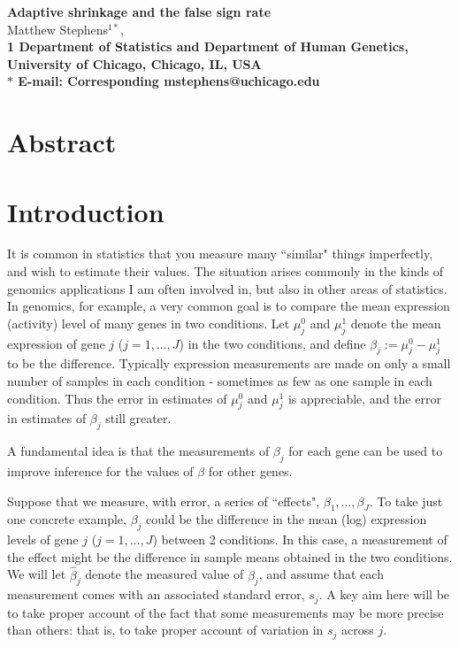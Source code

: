 \documentclass[10pt]{article}
\date{}
\begin{document}
\begin{flushleft}
{\Large
\textbf{Adaptive shrinkage and the false sign rate}
}
\\
Matthew Stephens$^{1*}$, 
\\
\bf{1} Department of Statistics and Department of Human Genetics, University of Chicago, Chicago, IL, USA
\\
$\ast$ E-mail: Corresponding mstephens@uchicago.edu
\end{flushleft}

\section*{Abstract}


\section*{Introduction}

It is common in statistics that you measure many ``similar" things imperfectly, and wish to estimate their values. The situation arises commonly in the kinds of genomics applications I am often involved in, but also in other areas of statistics.
In genomics, for example, a very common goal
is to compare the mean
expression (activity) level of many genes in two conditions.
Let $\mu^0_j$ and $\mu^1_j$ denote the mean expression 
of gene $j$ ($j=1,\dots,J$) in the two conditions, and define $\beta_j:= \mu^0_j - \mu^1_j$ to be the difference. Typically expression
measurements are made on only a small number of
samples in each condition - sometimes as few as one
sample in each condition. Thus the error in estimates
of $\mu^0_j$ and $\mu^1_j$ is appreciable, and the error
in estimates of $\beta_j$ still greater.

A fundamental idea is
that the measurements of $\beta_j$ for each gene can be used to improve inference for the values of $\beta$ for other genes.

Suppose that we measure, with error, a series of ``effects", $\beta_1,\dots,\beta_J$. To take just one concrete 
example, $\beta_j$ could be 
the difference in the mean (log) expression levels of gene $j$ ($j=1,\dots,J$) between 2 conditions. In this case, a measurement of
the effect might be the difference in sample means obtained in the two conditions. We will let $\hat\beta_j$ denote the measured value of $\beta_j$, and assume that
each measurement comes with an associated standard error, 
$s_j$. A key aim here will be to take proper account of the fact that some measurements may be more precise than others: that is, to take proper account of variation in $s_j$ across $j$.
\end{document}
